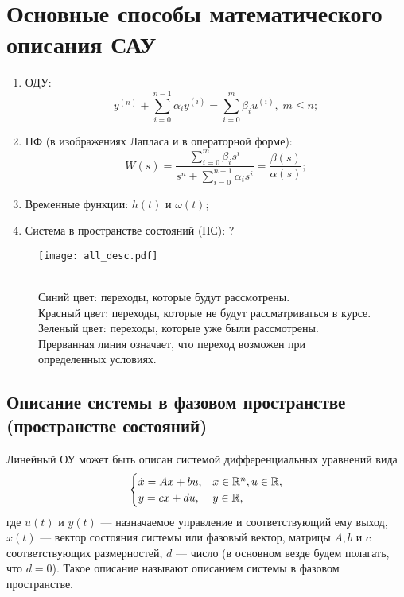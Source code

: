 \documentclass[../../TAU.tex]{subfiles}
\begin{document}
\section{Основные способы математического описания САУ}

    \begin{enumerate}
        \item ОДУ:
            $$
                y^{(n)}+\sum_{i=0}^{n-1}\alpha_iy^{(i)}=\sum_{i=0}^{m}\beta_iu^{(i)},\; m \le n;
            $$
        \item ПФ (в изображениях Лапласа и в операторной форме):
            $$
                W(s) = \frac{\sum_{i=0}^{m}\beta_is^i}{s^n+\sum_{i=0}^{n-1}\alpha_is^{i}} = \frac{\beta(s)}{\alpha(s)};
            $$
        \item Временные функции: $h(t)$ и $\omega(t)$;
        \item Система в пространстве состояний (ПС): ?
    \end{enumerate}

    \begin{center}
    \begin{figure}[H]
        \centering
        \texttt{[image: all\_desc.pdf]}
        \caption
        {    
            {\\\color{blue} Синий цвет}: переходы, которые будут рассмотрены.\\
            {\color{red} Красный цвет}: переходы, которые не будут рассматриваться в курсе.\\
            {\color{green} Зеленый цвет}: переходы, которые уже были рассмотрены.\\
            Прерванная линия означает, что переход возможен при определенных условиях.
        }
    \end{figure}
    \end{center}

\subsection{Описание системы в фазовом пространстве (пространстве состояний)}
    
    Линейный ОУ может быть описан системой дифференциальных уравнений вида
    \begin{equation}\label{ST_DS}
        \begin{cases}
            \dot x = Ax+bu,& x\in\mathbb{R}^{n},u\in\mathbb{R},\\
            y = cx +du,& y\in\mathbb{R},
        \end{cases}
    \end{equation}
    где $u(t)$ и $y(t)$ --- назначаемое управление и соответствующий ему выход, $x(t)$ --- вектор состояния системы или фазовый вектор, матрицы $A,b$ и $c$ соответствующих размерностей, $d$ --- число (в основном везде будем полагать, что $d=0$). Такое описание называют описанием системы в фазовом пространстве.
\end{document}
